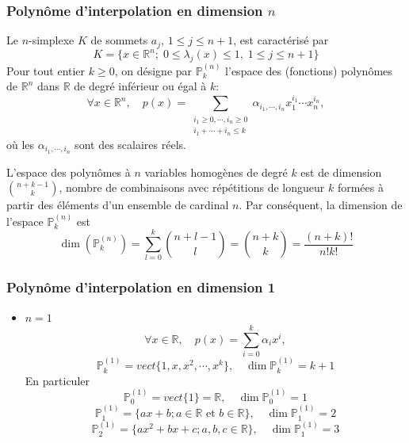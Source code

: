 \documentclass{beamer}
\begin{document}

\begin{frame}
\frametitle{Polynôme d'interpolation en dimension $n$}

Le $n$-simplexe $K$ de sommets $a_j$, $1\leq j\leq n+1$, est caractérisé par
\begin{equation}
K=\{x\in \mathbb{R}^n;\;0\leq \lambda_j(x) \leq 1,\; 1\leq j\leq n+1\}
\end{equation}
Pour tout entier   $k\geq 0$,  on désigne par $\mathbb{P}_k^{(n)}$ l'espace des (fonctions) polynômes de $\mathbb{R}^n$ dans $\mathbb{R}$ de degré inférieur ou égal à $k$:
\begin{equation}
\forall x\in\mathbb{R}^n,\quad p(x)=\sum_{\begin{array}{c} i_1\geq 0,\cdots ,i_n\geq 0\\i_1+\cdots +i_n\leq k \end{array}}\alpha_{i_1,\cdots,i_n}x_1^{i_1}\cdots x_n^{i_n},
\end{equation}
où les $\alpha_{i_1,\cdots,i_n}$  sont des scalaires réels.

  L'espace des polynômes à $n$ variables homogènes de degré $k$ est de dimension 
$\binom {n+k-1}k$, nombre de combinaisons avec répétitions de longueur $k$ formées à partir des éléments d'un ensemble de cardinal $n$. Par conséquent, la dimension de l'espace $\mathbb{P}_k^{(n)}$ est
\begin{equation}
\dim(\mathbb{P}_k^{(n)})=\sum_{l=0}^k \binom {n+l-1}l=\binom {n+k}k=\frac{(n+k)!}{n!k!}
\end{equation}
\end{frame}


\begin{frame}
\frametitle{Polynôme d'interpolation en dimension 1}

\begin{itemize}
\item $n=1$
\[
\forall x\in\mathbb{R},\quad p(x)=\sum_{i=0}^k\alpha_{i}x^{i},
\]
\[\mathbb{P}_k^{(1)}=vect\{1,x,x^2,\cdots,x^k\},\quad \dim \mathbb{P}_k^{(1)}=k+1\]
En particuler
\[\mathbb{P}_0^{(1)}=vect\{1\}=\mathbb{R} ,\quad \dim \mathbb{P}_0^{(1)}=1\]
\[\mathbb{P}_1^{(1)}=\{ax+b; a\in\mathbb{R}\mbox{ et }b\in\mathbb{R}\},\quad \dim \mathbb{P}_1^{(1)}=2\]
\[\mathbb{P}_2^{(1)}=\{ax^2+bx+c; a,b,c\in\mathbb{R}\},\quad \dim \mathbb{P}_1^{(1)}=3\]
\end{itemize}

\end{frame}
\end{document}
